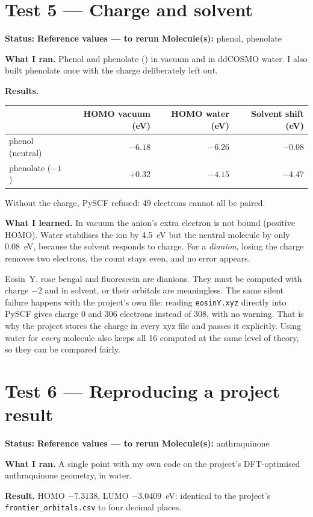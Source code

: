 \documentclass[11pt,a4paper]{article}
\newcommand{\torun}{\textcolor{orange!80!black}{\textbf{Reference values --- to rerun}}}
\newcommand{\lab}[3]{\section{#1}\noindent\textbf{Status:} #2 \qquad \textbf{Molecule(s):} #3\par}
\begin{document}
\lab{Test 5 --- Charge and solvent}{\torun}{phenol, phenolate}

\textbf{What I ran.} Phenol and phenolate () in vacuum and in ddCOSMO water. I also
built phenolate once with the charge deliberately left out.

\textbf{Results.}
\begin{center}\small
\begin{tabular}{@{}lrrr@{}}
\toprule
& HOMO vacuum (eV) & HOMO water (eV) & Solvent shift (eV) \\
\midrule
phenol (neutral) & $-6.18$ & $-6.26$ & $-0.08$ \\
phenolate ($-1$) & $+0.32$ & $-4.15$ & $-4.47$ \\
\bottomrule
\end{tabular}
\end{center}
Without the charge, PySCF refused: 49 electrons cannot all be paired.

\textbf{What I learned.} In vacuum the anion's extra electron is not bound (positive HOMO). Water
stabilises the ion by 4.5~eV but the neutral molecule by only 0.08~eV, because the solvent
responds to charge. For a \emph{dianion}, losing the charge removes two electrons, the count stays
even, and no error appears.

\begin{matters}
Eosin~Y, rose bengal and fluorescein are dianions. They must be computed with charge $-2$ and in
solvent, or their orbitals are meaningless. The same silent failure happens with the project's own
file: reading \texttt{eosinY.xyz} directly into PySCF gives charge 0 and 306 electrons instead of
308, with no warning. That is why the project stores the charge in every xyz file and passes it
explicitly. Using water for \emph{every} molecule also keeps all 16 computed at the same level of
theory, so they can be compared fairly.
\end{matters}

\lab{Test 6 --- Reproducing a project result}{\torun}{anthraquinone}

\textbf{What I ran.} A single point with my own code on the project's DFT-optimised anthraquinone
geometry, in water.

\textbf{Result.} HOMO $-7.3138$, LUMO $-3.0409$~eV: identical to the project's
\texttt{frontier\_orbitals.csv} to four decimal places.
\end{document}
